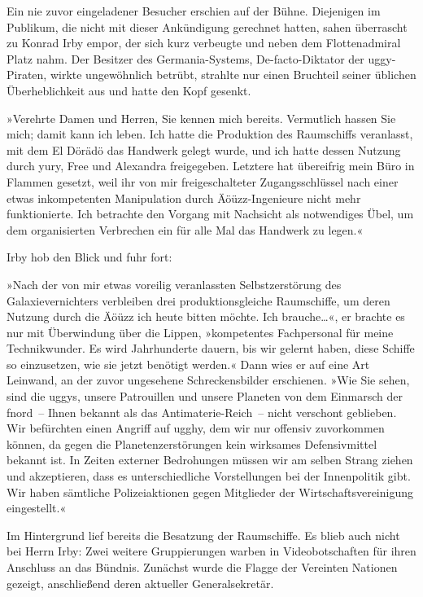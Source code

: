 Ein nie zuvor eingeladener Besucher erschien auf der Bühne. Diejenigen im Publikum, die nicht mit dieser Ankündigung gerechnet hatten, sahen überrascht zu Konrad Irby empor, der sich kurz verbeugte und neben dem Flottenadmiral Platz nahm. Der Besitzer des Germania-Systems, De-facto-Diktator der uggy-Piraten, wirkte ungewöhnlich betrübt, strahlte nur einen Bruchteil seiner üblichen Überheblichkeit aus und hatte den Kopf gesenkt.

»Verehrte Damen und Herren, Sie kennen mich bereits. Vermutlich hassen Sie mich; damit kann ich leben. Ich hatte die Produktion des Raumschiffs veranlasst, mit dem El Dörädö das Handwerk gelegt wurde, und ich hatte dessen Nutzung durch yury, Free und Alexandra freigegeben. Letztere hat übereifrig mein Büro in Flammen gesetzt, weil ihr von mir freigeschalteter Zugangsschlüssel nach einer etwas inkompetenten Manipulation durch Äöüzz-Ingenieure nicht mehr funktionierte. Ich betrachte den Vorgang mit Nachsicht als notwendiges Übel, um dem organisierten Verbrechen ein für alle Mal das Handwerk zu legen.«

Irby hob den Blick und fuhr fort:

»Nach der von mir etwas voreilig veranlassten Selbstzerstörung des Galaxievernichters verbleiben drei produktionsgleiche Raumschiffe, um deren Nutzung durch die Äöüzz ich heute bitten möchte. Ich brauche…«, er brachte es nur mit Überwindung über die Lippen, »kompetentes Fachpersonal für meine Technikwunder. Es wird Jahrhunderte dauern, bis wir gelernt haben, diese Schiffe so einzusetzen, wie sie jetzt benötigt werden.« Dann wies er auf eine Art Leinwand, an der zuvor ungesehene Schreckensbilder erschienen. »Wie Sie sehen, sind die uggys, unsere Patrouillen und unsere Planeten von dem Einmarsch der fnord~– Ihnen bekannt als das Antimaterie-Reich~– nicht verschont geblieben. Wir befürchten einen Angriff auf ugghy, dem wir nur offensiv zuvorkommen können, da gegen die Planetenzerstörungen kein wirksames Defensivmittel bekannt ist. In Zeiten externer Bedrohungen müssen wir am selben Strang ziehen und akzeptieren, dass es unterschiedliche Vorstellungen bei der Innenpolitik gibt. Wir haben sämtliche Polizeiaktionen gegen Mitglieder der Wirtschaftsvereinigung eingestellt.«

Im Hintergrund lief bereits die Besatzung der Raumschiffe. Es blieb auch nicht bei Herrn Irby: Zwei weitere Gruppierungen warben in Videobotschaften für ihren Anschluss an das Bündnis. Zunächst wurde die Flagge der Vereinten Nationen gezeigt, anschließend deren aktueller Generalsekretär.

